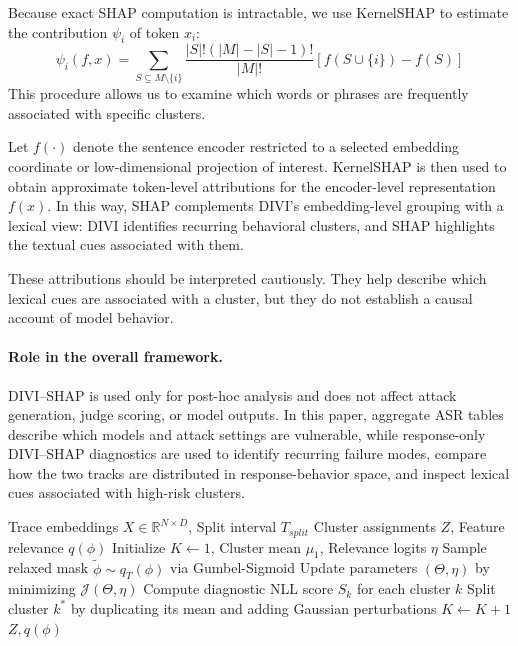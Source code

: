﻿\documentclass[conference]{IEEEtran}
\begin{document}
Because exact SHAP computation is intractable, we use KernelSHAP to estimate the contribution \(\psi_i\) of token \(x_i\):
\begin{equation}
\psi_i(f, x) = \sum_{S \subseteq M \setminus \{i\}} \frac{|S|!(|M| - |S| - 1)!}{|M|!} [f(S \cup \{i\}) - f(S)]
\end{equation}
This procedure allows us to examine which words or phrases are frequently associated with specific clusters.

Let \(f(\cdot)\) denote the sentence encoder restricted to a selected embedding coordinate or low-dimensional projection of interest. KernelSHAP is then used to obtain approximate token-level attributions for the encoder-level representation \(f(x)\). In this way, SHAP complements DIVI's embedding-level grouping with a lexical view: DIVI identifies recurring behavioral clusters, and SHAP highlights the textual cues associated with them.

These attributions should be interpreted cautiously. They help describe which lexical cues are associated with a cluster, but they do not establish a causal account of model behavior.

\paragraph{Role in the overall framework.}
DIVI--SHAP is used only for post-hoc analysis and does not affect attack generation, judge scoring, or model outputs. In this paper, aggregate ASR tables describe which models and attack settings are vulnerable, while response-only DIVI--SHAP diagnostics are used to identify recurring failure modes, compare how the two tracks are distributed in response-behavior space, and inspect lexical cues associated with high-risk clusters.

\begin{algorithm}[htbp]
\caption{DIVI Dynamic Clustering for Red Teaming \cite{chen2026divi}}
\label{alg:divi}
\begin{algorithmic}[1]
\REQUIRE Trace embeddings $X \in \mathbb{R}^{N \times D}$, Split interval $T_{split}$
\ENSURE Cluster assignments $Z$, Feature relevance $q(\phi)$
\STATE Initialize $K \leftarrow 1$, Cluster mean $\mu_1$, Relevance logits $\eta$
    \STATE Sample relaxed mask $\tilde{\phi} \sim q_T(\phi)$ via Gumbel-Sigmoid
    \STATE Update parameters $(\Theta, \eta)$ by minimizing $\mathcal{J}(\Theta, \eta)$
        \STATE Compute diagnostic NLL score $S_k$ for each cluster $k$
            \STATE Split cluster $k^*$ by duplicating its mean and adding Gaussian perturbations
            \STATE $K \leftarrow K + 1$
        \ENDIF
    \ENDIF
\ENDFOR
\RETURN $Z, q(\phi)$
\end{algorithmic}
\end{algorithm}
\end{document}
